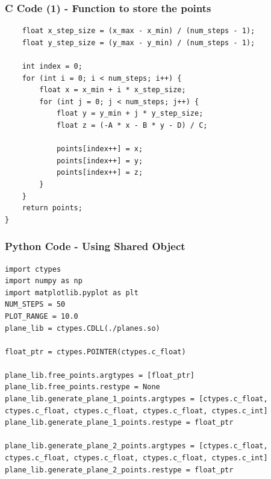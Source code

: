 \documentclass{beamer}
\begin{document}
\begin{frame}[fragile]
    \frametitle{C Code (1) - Function to store the points }

    \begin{lstlisting}
    float x_step_size = (x_max - x_min) / (num_steps - 1);
    float y_step_size = (y_max - y_min) / (num_steps - 1);

    int index = 0;
    for (int i = 0; i < num_steps; i++) {
        float x = x_min + i * x_step_size;
        for (int j = 0; j < num_steps; j++) {
            float y = y_min + j * y_step_size;
            float z = (-A * x - B * y - D) / C;

            points[index++] = x;
            points[index++] = y;
            points[index++] = z;
        }
    }
    return points;
}
    \end{lstlisting}
\end{frame}
\begin{frame}[fragile]
    \frametitle{Python Code - Using Shared Object}
    \begin{lstlisting}
import ctypes
import numpy as np
import matplotlib.pyplot as plt
NUM_STEPS = 50
PLOT_RANGE = 10.0
plane_lib = ctypes.CDLL(./planes.so)

float_ptr = ctypes.POINTER(ctypes.c_float)

plane_lib.free_points.argtypes = [float_ptr]
plane_lib.free_points.restype = None
plane_lib.generate_plane_1_points.argtypes = [ctypes.c_float, ctypes.c_float, ctypes.c_float, ctypes.c_float, ctypes.c_int]
plane_lib.generate_plane_1_points.restype = float_ptr

plane_lib.generate_plane_2_points.argtypes = [ctypes.c_float, ctypes.c_float, ctypes.c_float, ctypes.c_float, ctypes.c_int]
plane_lib.generate_plane_2_points.restype = float_ptr
\end{lstlisting}
\end{frame}
\end{document}
